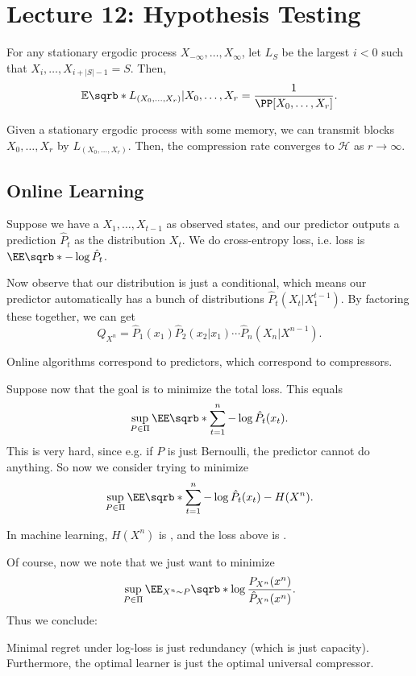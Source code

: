 \section*{Lecture 12: Hypothesis Testing}
\setcounter{section}{12}

\begin{lem}
	[Kac]
	For any stationary ergodic process $X_{-\infty}, \ldots, X_\infty$, let $L_S$ be the largest $i < 0$ such that $X_i, \ldots, X_{i+|S|-1} = S$. Then, \[
		\mathbb E\sqrb*{L_{(X_0, \ldots, X_r)} | X_0, \ldots, X_r} = \frac{1}{\PP[X_0, \ldots, X_r]}.
	\]
\end{lem}

\begin{thm}
	Given a stationary ergodic process with some memory, we can transmit blocks $X_0, \ldots, X_r$ by $L_{(X_0, \ldots, X_r)}$. 
	Then, the compression rate converges to $\mathcal H$ as $r\to \infty$.
\end{thm}

\subsection{Online Learning}

Suppose we have a $X_1, \ldots, X_{t-1}$ as observed states, and our predictor outputs a prediction $\hat P_t$ as the distribution $X_t$.
We do cross-entropy loss, i.e. loss is $\EE\sqrb*{-\log \hat P_t}$.

Now observe that our distribution is just a conditional, which means our predictor automatically has a bunch of distributions $\hat P_t(X_t | X_1^{t-1})$.
By factoring these together, we can get \[
	Q_{X^n} = \hat P_1(x_1) \hat P_2(x_2|x_1) \cdots \hat P_n(X_n|X^{n-1}).
\]
\begin{fact}
	Online algorithms correspond to predictors, which correspond to compressors.
\end{fact}
Suppose now that the goal is to minimize the total loss. This equals \[
	\sup_{P\in \Pi} \EE \sqrb*{\sum_{t=1}^n - \log \hat P_t(x_t)}.
\]
This is very hard, since e.g. if $P$ is just Bernoulli, the predictor cannot do anything.
So now we consider trying to minimize \[
	\sup_{P\in \Pi} \EE\sqrb*{\sum_{t=1}^n -\log \hat P_t(x_t) - H(X^n)}.
\]
\begin{defn}
	In machine learning, $H(X^n)$ is , and the loss above is .
\end{defn}
Of course, now we note that we just want to minimize \[
	\sup_{P\in \Pi} \EE_{X^n \sim P} \sqrb*{\log \frac{P_{X^n}(x^n)}{\hat P_{X^n}(x^n)}}.
\]
Thus we conclude:
\begin{fact}
	Minimal regret under log-loss is just redundancy (which is just capacity). Furthermore, the optimal learner is just the optimal universal compressor.
\end{fact}

